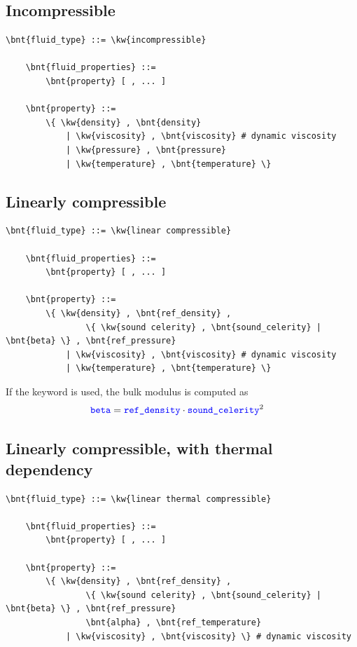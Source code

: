 \subsection{Incompressible}
\begin{Verbatim}[commandchars=\\\{\}]
    \bnt{fluid_type} ::= \kw{incompressible}

    \bnt{fluid_properties} ::=
        \bnt{property} [ , ... ]

    \bnt{property} ::=
        \{ \kw{density} , \bnt{density}
            | \kw{viscosity} , \bnt{viscosity} # dynamic viscosity
            | \kw{pressure} , \bnt{pressure}
            | \kw{temperature} , \bnt{temperature} \}
\end{Verbatim}

\subsection{Linearly compressible}
\begin{Verbatim}[commandchars=\\\{\}]
    \bnt{fluid_type} ::= \kw{linear compressible}

    \bnt{fluid_properties} ::=
        \bnt{property} [ , ... ]

    \bnt{property} ::=
        \{ \kw{density} , \bnt{ref_density} ,
                \{ \kw{sound celerity} , \bnt{sound_celerity} | \bnt{beta} \} , \bnt{ref_pressure}
            | \kw{viscosity} , \bnt{viscosity} # dynamic viscosity
            | \kw{temperature} , \bnt{temperature} \}
\end{Verbatim}
If the keyword  is used, the bulk modulus 
is computed as
\begin{align}
	\textcolor{blue}{\texttt{beta}}
	&=
	\textcolor{blue}{\texttt{ref\_density}} \cdot \textcolor{blue}{\texttt{sound\_celerity}}^2
\end{align}

\subsection{Linearly compressible, with thermal dependency}
\begin{Verbatim}[commandchars=\\\{\}]
    \bnt{fluid_type} ::= \kw{linear thermal compressible}

    \bnt{fluid_properties} ::= 
        \bnt{property} [ , ... ]

    \bnt{property} ::=
        \{ \kw{density} , \bnt{ref_density} ,
                \{ \kw{sound celerity} , \bnt{sound_celerity} | \bnt{beta} \} , \bnt{ref_pressure}
                \bnt{alpha} , \bnt{ref_temperature}
            | \kw{viscosity} , \bnt{viscosity} \} # dynamic viscosity
\end{Verbatim}

